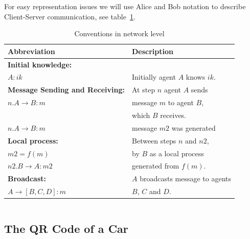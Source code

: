 For easy representation issues we will use Alice and Bob notation to 
describe Client-Server communication, see table~\ref{table:NetConventions}.
\begin{table}[htb]
\footnotesize
\begin{center}
\caption{Conventions in network level}
\label{table:NetConventions}
\begin{tabular}{|l|l|}
\hline
{\bf Abbreviation}                      & {\bf Description}                    \\\hline\hline
\textbf{Initial knowledge:}             &                                      \\
$A : ik$                                &  Initially agent $A$ knows $ik$.    \\ \hline 
\textbf{Message Sending and Receiving:} &  At step $n$ agent $A$ sends         \\ 
$n. A \rightarrow B: m$                 &  message $m$ to agent $B$,\\
                                        &  which $B$ receives.      \\ \hline 
$n. A\rightarrow B: m$                  &  message $m2$ was generated \\ 
\hspace{5mm}\textbf{Local process:}     &  Between steps $n$ and $n2$,    \\ 
\hspace{5mm}$m2 = f(m)$                 &  by $B$ as a local process \\ 
$n2. B\rightarrow A: m2$                &  generated from $f(m)$.     \\ \hline 
\textbf{Broadcast:}                     &  $A$ broadcasts message to agents\\ 
$A \rightarrow [B, C, D]: m$            &  $B$, $C$ and $D$.\\ \hline \hline 
\end{tabular}
\end{center}
\end{table}
\normalsize


$$$$


\subsection{The QR Code of a Car}

